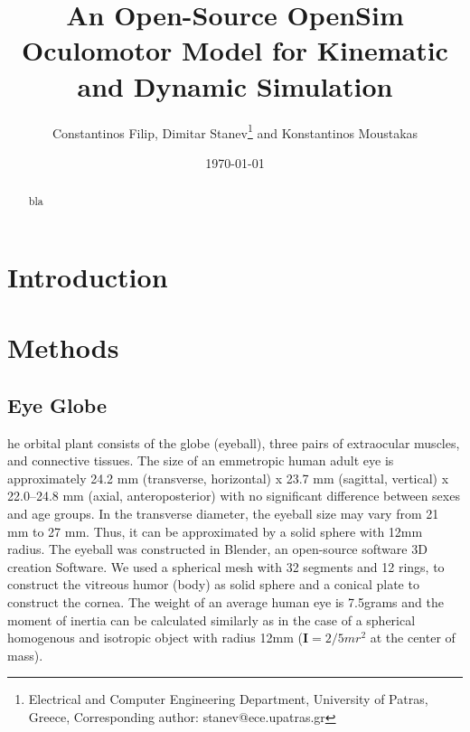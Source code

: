 \documentclass[11pt,a4paper,draft=false]{report}
\title{An Open-Source OpenSim Oculomotor Model for Kinematic and Dynamic
  Simulation}
\author{Constantinos Filip, Dimitar Stanev\footnote{Electrical and Computer
    Engineering Department, University of Patras, Greece, Corresponding author:
    stanev@ece.upatras.gr} and Konstantinos Moustakas}
\date{\today}
\newcommand{\mat}[1]{\bm{#1}}
\begin{document}

\maketitle

\begin{abstract}
  bla
\end{abstract}

\section*{Introduction}\label{sec:introduction}

\section*{Methods}\label{sec:methods}

\subsection*{Eye Globe}\label{sec:eye-globe}

he orbital plant consists of the globe (eyeball), three pairs of extraocular
muscles, and connective tissues. The size of an emmetropic human adult eye is
approximately 24.2 mm (transverse, horizontal) x 23.7 mm (sagittal, vertical) x
22.0–24.8 mm (axial, anteroposterior) with no significant difference between
sexes and age groups. In the transverse diameter, the eyeball size may vary from
21 mm to 27 mm. Thus, it can be approximated by a solid sphere with 12mm
radius. The eyeball was constructed in Blender, an open-source software 3D
creation Software. We used a spherical mesh with 32 segments and 12 rings, to
construct the vitreous humor (body) as solid sphere and a conical plate to
construct the cornea. The weight of an average human eye is 7.5grams and the
moment of inertia can be calculated similarly as in the case of a spherical
homogenous and isotropic object with radius 12mm ($\mat{I} = 2/5 m r^2$ at the
center of mass).

\end{document}
